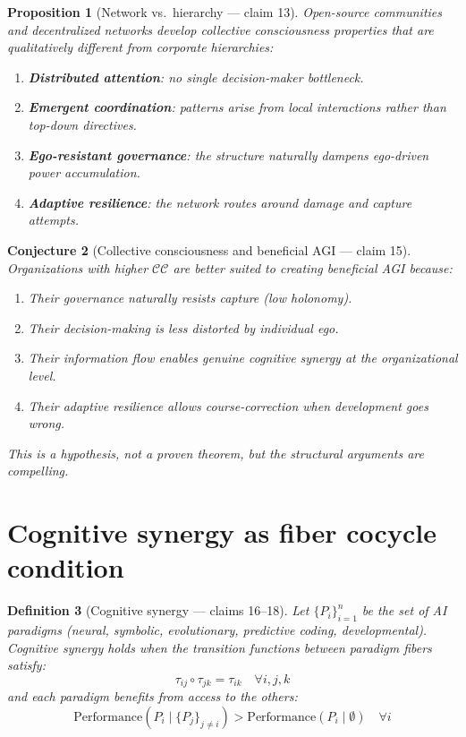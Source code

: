 \documentclass[11pt,a4paper]{article}
\newtheorem{definition}{Definition}[section]
\newtheorem{proposition}[definition]{Proposition}
\newtheorem{conjecture}[definition]{Conjecture}
\begin{document}
\begin{proposition}[Network vs.\ hierarchy --- claim 13]
\label{prop:network-vs-hierarchy}
Open-source communities and decentralized networks develop collective
consciousness properties that are qualitatively different from corporate
hierarchies:
\begin{enumerate}
\item \textbf{Distributed attention}: no single decision-maker bottleneck.
\item \textbf{Emergent coordination}: patterns arise from local interactions
  rather than top-down directives.
\item \textbf{Ego-resistant governance}: the structure naturally dampens
  ego-driven power accumulation.
\item \textbf{Adaptive resilience}: the network routes around damage and
  capture attempts.
\end{enumerate}
\end{proposition}

\begin{conjecture}[Collective consciousness and beneficial AGI --- claim 15]
\label{conj:beneficial}
Organizations with higher $\mathcal{CC}$ are better suited to creating
beneficial AGI because:
\begin{enumerate}
\item Their governance naturally resists capture (low holonomy).
\item Their decision-making is less distorted by individual ego.
\item Their information flow enables genuine cognitive synergy at the
  organizational level.
\item Their adaptive resilience allows course-correction when development
  goes wrong.
\end{enumerate}
This is a hypothesis, not a proven theorem, but the structural arguments
are compelling.
\end{conjecture}

\section{Cognitive synergy as fiber cocycle condition}
\label{sec:synergy}

\begin{definition}[Cognitive synergy --- claims 16--18]
\label{def:synergy}
Let $\{P_i\}_{i=1}^n$ be the set of AI paradigms (neural, symbolic,
evolutionary, predictive coding, developmental). Cognitive synergy holds
when the transition functions between paradigm fibers satisfy:
\[
  \tau_{ij} \circ \tau_{jk} = \tau_{ik} \quad \forall i, j, k
\]
and each paradigm benefits from access to the others:
\[
  \text{Performance}(P_i \mid \{P_j\}_{j \neq i}) >
  \text{Performance}(P_i \mid \emptyset) \quad \forall i
\]
\end{definition}
\end{document}
